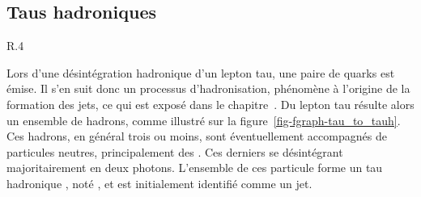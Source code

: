 \subsection{Taus hadroniques}\label{chapter-HTT_analysis-section-objects-taus}

\begin{wrapfigure}{R}{.4\textwidth}
\centering

\vspace{\baselineskip}
\caption{Diagramme de Feynman de désintégration hadronique d'un \leptau.}
\label{fig-fgraph-tau_to_tauh}
\end{wrapfigure}
Lors d'une désintégration hadronique d'un lepton tau, une paire de quarks est émise.
Il s'en suit donc un processus d'hadronisation, phénomène à l'origine de la formation des jets, ce qui est exposé dans le chapitre~.
Du lepton tau résulte alors un ensemble de hadrons, comme illustré sur la figure~\ref{fig-fgraph-tau_to_tauh}.
Ces hadrons, en général trois ou moins, sont éventuellement accompagnés de particules neutres, principalement des \pionnull.
Ces derniers se désintégrant majoritairement en deux photons.
L'ensemble de ces particule forme un \og tau hadronique \fg, noté \tauh, et est initialement identifié comme un jet.
